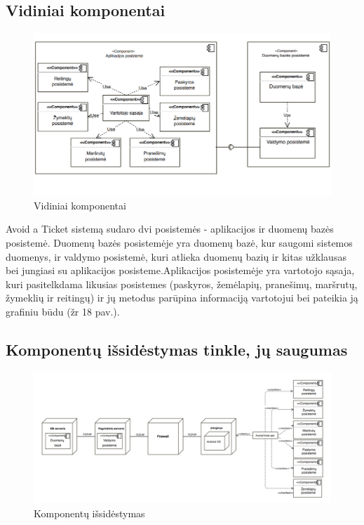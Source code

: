 \documentclass{VUMIFPSkursinis}
\begin{document}
\subsection{Vidiniai komponentai}

\begin{figure}[H]
	\centering
	\includegraphics[scale=0.7]{img/Vidiniai_komponentai}
	\caption{Vidiniai komponentai}
	\label{img:matrix}
\end{figure}

Avoid a Ticket sistemą sudaro dvi posistemės - aplikacijos ir duomenų bazės posistemė. Duomenų bazės posistemėje yra duomenų bazė, kur saugomi sistemos duomenys, ir valdymo posistemė, kuri atlieka duomenų bazių ir kitas užklausas bei jungiasi su aplikacijos posisteme.Aplikacijos posistemėje yra vartotojo sąsaja, kuri pasitelkdama likusias posistemes (paskyros, žemėlapių, pranešimų, maršrutų, žymeklių ir reitingų) ir jų metodus parūpina informaciją vartotojui bei pateikia ją grafiniu būdu (žr 18 pav.).

\subsection{Komponentų išsidėstymas tinkle, jų saugumas}

\begin{figure}[H]
	\centering
	\includegraphics[scale=0.4]{img/Komponentu_issidestymas}
	\caption{Komponentų išsidėstymas}
	\label{img:matrix}
\end{figure}
\end{document}
